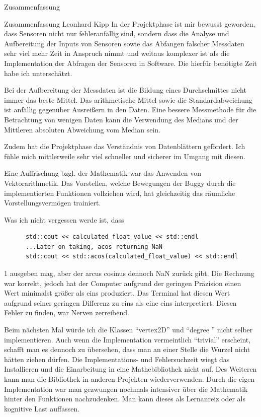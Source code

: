 \documentclass[12pt]{report}
\begin{document}
\begin{section}{Zusammenfassung}
  \begin{subsection}{Zusammenfassung Leonhard Kipp}
    In der Projektphase ist mir bewusst geworden, dass Sensoren nicht nur
    fehleranfällig sind, sondern dass die Analyse und Aufbereitung der Inputs
    von Sensoren sowie das Abfangen falscher Messdaten sehr viel mehr Zeit in Anspruch nimmt und weitaus komplexer
    ist als die Implementation der Abfragen der Sensoren in Software. Die
    hierfür benötigte Zeit habe ich unterschätzt.
    
    Bei der Aufbereitung der Messdaten ist die Bildung eines Durchschnittes nicht
    immer das beste Mittel. Das arithmetische Mittel sowie die
    Standardabweichung ist anfällig gegenüber Ausreißern
    in den Daten. Eine bessere Messmethode für die Betrachtung von wenigen Daten
    kann die Verwendung des Medians und der Mittleren absoluten Abweichung vom
    Median sein.

    Zudem hat die Projektphase das Verständnis von Datenblättern gefördert. Ich
    fühle mich mittlerweile sehr viel schneller und sicherer im Umgang mit diesen.

    Eine Auffrischung bzgl. der Mathematik war das Anwenden von Vektorarithmetik. Das Vorstellen,
    welche Bewegungen der Buggy durch die implementierten Funktionen vollziehen
    wird, hat gleichzeitig das räumliche Vorstellungsvermögen trainiert.

    Was ich nicht vergessen werde ist, dass
    \begin{lstlisting}
      std::cout << calculated_float_value << std::endl
      ...Later on taking, acos returning NaN
      std::cout << std::acos(calculated_float_value) << std::endl
    \end{lstlisting}
    1 ausgeben mag, aber der arcus cosinus dennoch NaN zurück gibt.
    Die Rechnung war korrekt, jedoch hat der Computer aufgrund der geringen
    Präzision einen Wert minimalst größer als eins produziert. Das Terminal hat
    diesen Wert aufgrund seiner geringen Differenz zu eins als eine eins interpretiert.
    Diesen Fehler zu finden, war Nerven zerreibend.

    Beim nächsten Mal würde ich die Klassen "`vertex2D"' und "`degree "' nicht
    selber implementieren. Auch wenn die Implementation vermeintlich "`trivial"'
    erscheint, schafft man es dennoch zu übersehen, dass man an einer Stelle die
    Wurzel nicht hätten ziehen dürfen. Die Implementations- und Fehlersuchzeit
    wiegt das Installieren und die Einarbeitung in eine Mathebibliothek nicht
    auf. Des Weiteren kann man die Bibliothek in anderen Projekten
    wiederverwenden.
    Durch die eigen Implementation war man gezwungen nochmals
    intensiver über die Mathematik hinter den Funktionen nachzudenken. Man kann
    dieses als Lernanreiz oder als kognitive Last auffassen.


\end{subsection}
\end{section}
\end{document}
